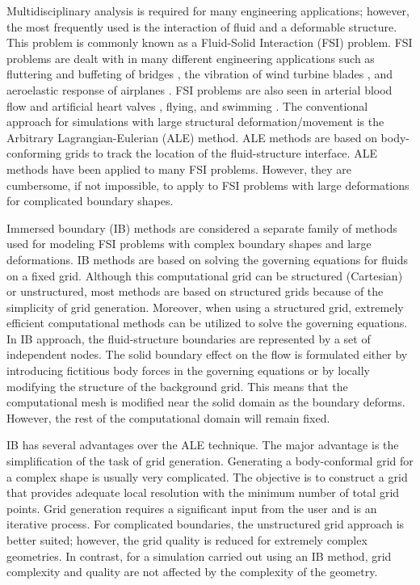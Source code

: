 Multidisciplinary analysis is required for many engineering applications; however, the most frequently used is the interaction of fluid and a deformable structure. This problem is commonly known as a Fluid-Solid Interaction (FSI) problem. FSI problems are dealt with in many different engineering applications such as fluttering and buffeting of bridges \cite{jain1996coupled}, the vibration of wind turbine blades \cite{arrigan2011control}, and aeroelastic response of airplanes \cite{farhat2006provably}. FSI problems are also seen in arterial blood flow and artificial heart valves \cite{sotiropoulos2009review}, flying, and swimming \cite{kern2006simulations}. The conventional approach for simulations with large structural deformation/movement is the Arbitrary Lagrangian-Eulerian (ALE) method. ALE methods are based on body-conforming grids to track the location of the fluid-structure interface. ALE methods have been applied to many FSI problems. However, they are cumbersome, if not impossible, to apply to FSI problems with large deformations for complicated boundary shapes.

Immersed boundary (IB) methods are considered a separate family of methods used for modeling FSI problems with complex boundary shapes and large deformations. IB methods are based on solving the governing equations for fluids on a fixed grid. Although this computational grid can be structured (Cartesian) or unstructured, most methods are based on structured grids because of the simplicity of grid generation. Moreover, when using a structured grid, extremely efficient computational methods can be utilized to solve the governing equations. In IB approach, the fluid-structure boundaries are represented by a set of independent nodes. The solid boundary effect on the flow is formulated either by introducing fictitious body forces in the governing equations or by locally modifying the structure of the background grid. This means that the computational mesh is modified near the solid domain as the boundary deforms. However, the rest of the computational domain will remain fixed.

IB has several advantages over the ALE technique. The major advantage is the simplification of the task of grid generation. Generating a body-conformal grid for a complex shape is usually very complicated. The objective is to construct a grid that provides adequate local resolution with the minimum number of total grid points. Grid generation requires a significant input from the user and is an iterative process. For complicated boundaries, the unstructured grid approach is better suited; however, the grid quality is reduced for extremely complex geometries. In contrast, for a simulation carried out using an IB method, grid complexity and quality are not affected by the complexity of the geometry. 

